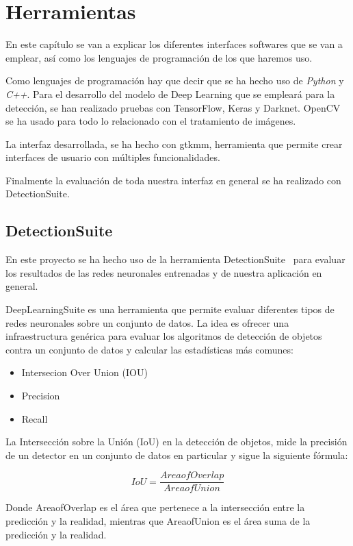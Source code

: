 \chapter{Herramientas}\label{cap.herramientas}
En este capítulo se van a explicar los diferentes interfaces softwares que se van a emplear, así como los lenguajes de programación de los que haremos uso.

Como lenguajes de programación hay que decir que se ha hecho uso de \textit{Python} y \textit{C++}. Para el desarrollo del modelo de Deep Learning que se empleará para la detección, se han realizado pruebas con TensorFlow, Keras y Darknet. OpenCV se ha usado para todo lo relacionado con el tratamiento de imágenes.

La interfaz desarrollada, se ha hecho con gtkmm, herramienta que permite crear interfaces de usuario con múltiples funcionalidades.

Finalmente la evaluación de toda nuestra interfaz en general se ha realizado con DetectionSuite.



\section{DetectionSuite}
En este proyecto se ha hecho uso de la herramienta DetectionSuite~\cite{detectionsuite} para evaluar los resultados de las redes neuronales entrenadas y de nuestra aplicación en general.

DeepLearningSuite es una herramienta que permite evaluar diferentes tipos de redes neuronales sobre un conjunto de datos. La idea es ofrecer una infraestructura genérica para evaluar los algoritmos de detección de objetos contra un conjunto de datos y calcular las estadísticas más comunes:
\begin{itemize}
    \item Intersecion Over Union (IOU)
    \item Precision
    \item Recall
\end{itemize}

La Intersección sobre la Unión (IoU) en la detección de objetos, mide la precisión de un detector en un conjunto de datos en particular y sigue la siguiente fórmula:

\begin{equation}\label{iou}
IoU = \frac{AreaofOverlap}{AreaofUnion}
\end{equation}

Donde AreaofOverlap es el área que pertenece a la intersección entre la predicción y la realidad, mientras que AreaofUnion es el área suma de la predicción y la realidad.

